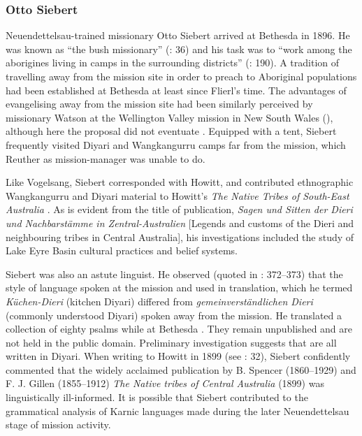 \subsubsection{Otto Siebert}
\label{sec:key:8.4.2.3}\label{bkm:Ref456091577}

Neuendettelsau-trained missionary Otto Siebert arrived at Bethesda in 1896. He was known as ``the bush missionary'' (\citealt{hercus_otto_2004}: 36) and his task was to “work among the aborigines living in camps in the surrounding districts” (\citealt{hebart_united_1938}: 190). A tradition of travelling away from the mission site in order to preach to Aboriginal populations had been established at Bethesda at least since Flierl’s time. The advantages of evangelising away from the mission site had been similarly perceived by missionary Watson at the Wellington Valley mission in New South Wales (), although here the proposal did not eventuate \citep[339]{bridges_church_1978}. Equipped with a tent, Siebert frequently visited Diyari and Wangkangurru camps far from the mission, which Reuther as mission-manager was unable to do.

Like Vogelsang, Siebert corresponded with Howitt, and contributed ethnographic Wangkangurru and Diyari material to Howitt’s \textit{The Native Tribes of South-East Australia} \citeyearpar{howitt_native_1904}. As is evident from the title of  publication, \textit{Sagen und Sitten der Dieri und Nachbarstämme in Zentral-Australien} [Legends and customs of the Dieri and neighbouring tribes in Central Australia], his investigations included the study of Lake Eyre Basin cultural practices and belief systems.

Siebert was also an astute linguist. He observed (quoted in \citealt{kneebone_teichelmann_2005}: 372--373) that the style of language spoken at the mission and used in translation, which he termed \textit{Küchen-Dieri} (kitchen Diyari) differed from \textit{gemeinverständlichen Dieri} (commonly understood Diyari) spoken away from the mission. He translated a collection of eighty psalms while at Bethesda \citep[42]{nobbs_bush_2005}. They remain unpublished and are not held in the public domain. Preliminary investigation suggests that are all written in Diyari. When writing to Howitt in 1899 (see \citealt{nobbs_bush_2005}: 32), Siebert confidently commented that the widely acclaimed publication by B. Spencer (1860--1929) and F. J. Gillen (1855--1912) \textit{The Native tribes of Central Australia} (1899) was linguistically ill-informed. It is possible that Siebert contributed to the grammatical analysis of Karnic languages made during the later Neuendettelsau stage of mission activity.


